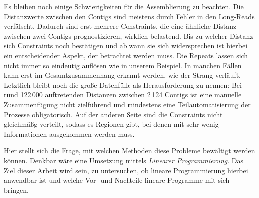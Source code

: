 Es bleiben noch einige Schwierigkeiten für die Assemblierung zu beachten. Die Distanzwerte zwischen den Contigs sind meistens durch Fehler in den Long-Reads verfälscht. Dadurch sind erst mehrere Constraints, die eine ähnliche Distanz zwischen zwei Contigs prognostizieren, wirklich belastend. Bis zu 
welcher Distanz sich Constraints noch bestätigen und ab wann sie sich widersprechen ist hierbei ein entscheidender Aspekt, der betrachtet werden muss. Die Repeats lassen sich nicht immer so eindeutig auflösen wie in unserem Beispiel. In manchen Fällen kann erst im Gesamtzusammenhang erkannt werden, wie der Strang verläuft. Letztlich bleibt noch die große Datenfülle als Herausforderung zu nennen: Bei rund 122\,000 auftretenden Distanzen zwischen 2\,124 Contigs ist eine manuelle Zusammenfügung nicht zielführend und mindestens eine Teilautomatisierung der Prozesse obligatorisch. Auf der anderen Seite sind die Constraints nicht gleichmäßg verteilt, sodass es Regionen gibt, bei denen mit sehr wenig Informationen ausgekommen werden muss.

Hier stellt sich die Frage, mit welchen Methoden diese Probleme bewältigt werden können. Denkbar wäre eine Umsetzung mittels 
\emph{Linearer Programmierung}. Das Ziel dieser Arbeit wird sein, zu untersuchen, ob lineare Programmierung hierbei anwendbar ist
 und welche Vor- und Nachteile lineare Programme mit sich bringen.
